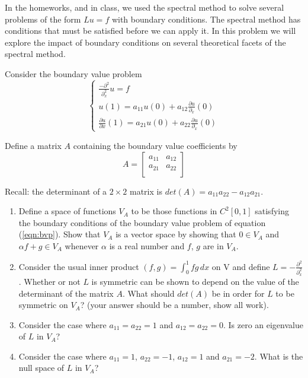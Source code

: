 In the homeworks, and in class, we used the spectral method to solve several problems of the form $Lu = f$ with boundary conditions.   The spectral method has conditions that must be satisfied before we can apply it.  In this problem we will explore the impact of boundary conditions on several theoretical facets of the spectral method.

Consider the boundary value problem
\begin{equation}\label{eqn:bvp}
 \left\{
     \begin{array}{c}
       \frac{- \partial^{2}}{\partial_x^2}u = f\\
       u(1) = a_{11} u(0) + a_{12} \frac{\partial u}{\partial_x}(0)\\
       \frac{\partial u}{\partial x}(1) = a_{21} u(0) + a_{22}\frac{\partial u}{\partial_x}(0)
     \end{array}
   \right.
\end{equation}

Define a matrix $A$  containing the boundary value coefficients by
\[
 A = \left[
     \begin{array}{cc}
       a_{11} & a_{12} \\
      a_{21} & a_{22}\\
     \end{array}
   \right]
\]

Recall: the determinant of a $2\times 2$ matrix is $det(A) = a_{11}a_{22} - a_{12}a_{21}$.

\begin{enumerate}
\item Define a space of functions $V_A$ to be those functions in $C^{2}[0,1]$ satisfying the boundary conditions of the boundary value problem of equation (\ref{eqn:bvp}).  Show that $V_A$ is a vector space by showing that $0\in V_A$ and $\alpha f + g \in V_A$ whenever $\alpha$ is a real number and $f$, $g$ are in $V_A$.

\item Consider the usual inner product $(f,g) = \int_{0}^{1} fg\, dx$ on V and define $L= -\frac{ \partial^{2}}{\partial_x^2}$.  Whether or not $L$ is symmetric can be shown to depend on the value of the determinant of the matrix $A$.  What should $det(A)$ be in order for $L$ to be symmetric on $V_A$? (your answer should be a number, show all work).

\item Consider the case where $a_{11} = a_{22} = 1$ and $a_{12} = a_{22} = 0$. Is zero an eigenvalue of $L$ in $V_A$? 

\item Consider the case where $a_{11} = 1$, $a_{22} = -1$, $a_{12} = 1$ and $a_{21} = -2$. What is the null space of $L$ in $V_A$?




\end{enumerate}



